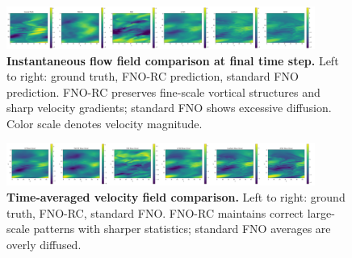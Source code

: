 \documentclass[11pt]{article}
\begin{document}
\begin{figure}[p]
\centering
\includegraphics[width=0.9\textwidth]{../实验图/final_slice.png}
\caption{\textbf{Instantaneous flow field comparison at final time step.} Left to right: ground truth, FNO-RC prediction, standard FNO prediction. FNO-RC preserves fine-scale vortical structures and sharp velocity gradients; standard FNO shows excessive diffusion. Color scale denotes velocity magnitude.}
\label{fig:flow_instant}
\end{figure}

\begin{figure}[p]
\centering
\includegraphics[width=0.9\textwidth]{../实验图/mean_time.png}
\caption{\textbf{Time-averaged velocity field comparison.} Left to right: ground truth, FNO-RC, standard FNO. FNO-RC maintains correct large-scale patterns with sharper statistics; standard FNO averages are overly diffused.}
\label{fig:flow_mean}
\end{figure}
\end{document}
